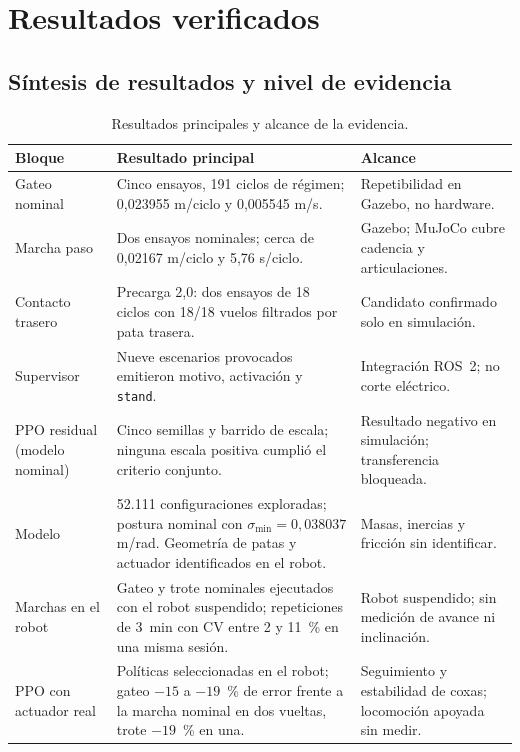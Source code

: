 \chapter{Resultados verificados}

\section{Síntesis de resultados y nivel de evidencia}

\begin{table}[H]
\centering
\caption{Resultados principales y alcance de la evidencia.}
\label{tab:sintesis-resultados}
\small
\begin{tabular}{p{}p{}p{}}
\toprule
Bloque & Resultado principal & Alcance \\
\midrule
Gateo nominal & Cinco ensayos, 191 ciclos de régimen; 0,023955 m/ciclo y 0,005545 m/s. & Repetibilidad en Gazebo, no hardware. \\
Marcha paso & Dos ensayos nominales; cerca de 0,02167 m/ciclo y 5,76 s/ciclo. & Gazebo; MuJoCo cubre cadencia y articulaciones. \\
Contacto trasero & Precarga 2,0: dos ensayos de 18 ciclos con 18/18 vuelos filtrados por pata trasera. & Candidato confirmado solo en simulación. \\
Supervisor & Nueve escenarios provocados emitieron motivo, activación y \texttt{stand}. & Integración ROS~2; no corte eléctrico. \\
PPO residual (modelo nominal) & Cinco semillas y barrido de escala; ninguna escala positiva cumplió el criterio conjunto. & Resultado negativo en simulación; transferencia bloqueada. \\
Modelo & 52.111 configuraciones exploradas; postura nominal con $\sigma_{\min}=0{,}038037$ m/rad. Geometría de patas y actuador identificados en el robot. & Masas, inercias y fricción sin identificar. \\
Marchas en el robot & Gateo y trote nominales ejecutados con el robot suspendido; repeticiones de 3~min con CV entre 2 y 11~\% en una misma sesión. & Robot suspendido; sin medición de avance ni inclinación. \\
PPO con actuador real & Políticas seleccionadas en el robot; gateo $-15$ a $-19$~\% de error frente a la marcha nominal en dos vueltas, trote $-19$~\% en una. & Seguimiento y estabilidad de coxas; locomoción apoyada sin medir. \\
\bottomrule
\end{tabular}
\end{table}

